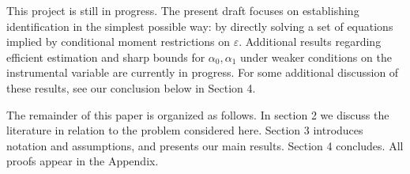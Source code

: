 This project is still in progress. 
The present draft focuses on establishing identification in the simplest possible way: by directly solving a set of equations implied by conditional moment restrictions on $\varepsilon$.
Additional results regarding efficient estimation and sharp bounds for $\alpha_0, \alpha_1$ under weaker conditions on the instrumental variable are currently in progress.
For some additional discussion of these results, see our conclusion below in Section 4.

The remainder of this paper is organized as follows. 
In section 2 we discuss the literature in relation to the problem considered here. 
Section 3 introduces notation and assumptions, and presents our main results.
Section 4 concludes.
All proofs appear in the Appendix.


